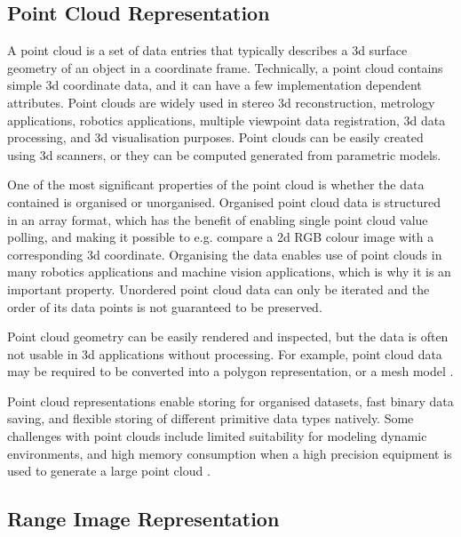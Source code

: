 \documentclass[12pt,a4paper,oneside,pdftex]{report}
\begin{document}
\subsection{Point Cloud Representation}
\label{subsection:point_cloud_representation}

A point cloud is a set of data entries that typically describes a 3d surface geometry of an object in a coordinate frame. Technically, a point cloud contains simple 3d coordinate data, and it can have a few implementation dependent attributes. Point clouds are widely used in stereo 3d reconstruction, metrology applications, robotics applications, multiple viewpoint data registration, 3d data processing, and 3d visualisation purposes. Point clouds can be easily created using 3d scanners, or they can be computed generated from parametric models.

One of the most significant properties of the point cloud is whether the data contained is organised or unorganised. Organised point cloud data is structured in an array format, which has the benefit of enabling single point cloud value polling, and making it possible to e.g. compare a 2d RGB colour image with a corresponding 3d coordinate. Organising the data enables use of point clouds in many robotics applications and machine vision applications, which is why it is an important property. Unordered point cloud data can only be iterated and the order of its data points is not guaranteed to be preserved.

Point cloud geometry can be easily rendered and inspected, but the data is often not usable in 3d applications without processing. For example, point cloud data may be required to be converted into a polygon representation, or a mesh model \citep{Rusinkiewicz00}.

Point cloud representations enable storing for organised datasets, fast binary data saving, and flexible storing of different primitive data types natively. Some challenges with point clouds include limited suitability for modeling dynamic environments, and high memory consumption when a high precision equipment is used to generate a large point cloud \citep{PCDFormat14, Hornung10}.


\subsection{Range Image Representation}
\label{subsection:range_image_representation}
\end{document}
